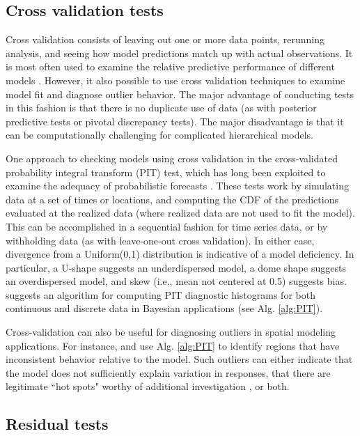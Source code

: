 \documentclass[12pt,english]{article}
\begin{document}
\begin{spacing}{1.9}
\subsection{Cross validation tests}

Cross validation consists of leaving out one or more data points, rerunning analysis, and seeing how model predictions match up with actual observations.  It is most often used to examine the relative predictive performance of different models \citep[i.e., for model selection; see e.g.][]{ArlotCelisse2010}.  However, it also possible to use cross validation techniques to examine model fit and diagnose outlier behavior.  The major advantage of conducting tests in this fashion is that there is no duplicate use of data (as with posterior predictive tests or pivotal discrepancy tests).  The major disadvantage is that it can be computationally challenging for complicated hierarchical models.

One approach to checking models using cross validation in the cross-validated probability integral transform (PIT) test, which has long been exploited to examine the adequacy of probabilistic forecasts \citep[e.g.,][]{Dawid1984,Fruiiwirth1996,GneitingEtAl2007,CzadoEtAl2009}. These tests work by simulating data at a set of times or locations, and computing the CDF of the predictions evaluated at the realized data (where realized data are not used to fit the model).  This can be accomplished in a sequential fashion for time series data, or by withholding data (as with leave-one-out cross validation).  In either case, divergence from a Uniform(0,1) distribution is indicative of a model deficiency.  In particular, a U-shape suggests an underdispersed model, a dome shape suggests an overdispersed model, and skew (i.e., mean not centered at 0.5) suggests bias.  \citet{Congdon2014} suggests an algorithm for computing PIT diagnostic histograms for both continuous and discrete data in Bayesian applications (see Alg. \ref{alg:PIT}).


Cross-validation can also be useful for diagnosing outliers in spatial modeling applications.  For instance, \citet{SternCressie2000} and \citet{MarshallSpiegelhalter2003} use Alg. \ref{alg:PIT} to identify regions that have inconsistent behavior relative to the model.  Such outliers can either indicate that the model does not sufficiently explain variation in responses, that there are legitimate ``hot spots" worthy of additional investigation \cite{MarshallSpiegelhalter2003}, or both.

\subsection{Residual tests}


\end{spacing}
\end{document}
